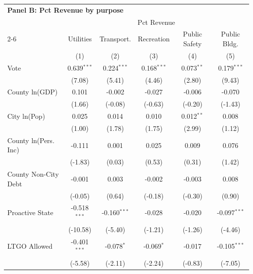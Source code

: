 \begingroup
\centering
\begin{tabular*}{\textwidth}{@{\extracolsep{\fill}}lccccc}
\multicolumn{5}{l}{\textbf{Panel B: Pct Revenue by purpose}}\\

\addlinespace
   \toprule
    & \multicolumn{5}{c}{Pct Revenue}\\
   \cmidrule(lr){2-6}
                        & Utilities      & Transport.     & Recreation    & Public Safety & Public Bldg. \\   
                        & (1)            & (2)            & (3)           & (4)           & (5)\\  
   \midrule 
   Vote                 & 0.639$^{***}$  & 0.224$^{***}$  & 0.168$^{***}$ & 0.073$^{**}$  & 0.179$^{***}$\\   
                        & (7.08)        & (5.41)        & (4.46)       & (2.80)       & (9.43)\\   
   County ln(GDP)       & 0.101          & -0.002         & -0.027        & -0.006        & -0.070\\   
                        & (1.66)        & (-0.08)       & (-0.63)      & (-0.20)      & (-1.43)\\   
   City ln(Pop)         & 0.025          & 0.014          & 0.010         & 0.012$^{**}$  & 0.008\\   
                        & (1.00)        & (1.78)        & (1.75)       & (2.99)       & (1.12)\\   
   County ln(Pers. Inc) & -0.111         & 0.001          & 0.025         & 0.009         & 0.076\\   
                        & (-1.83)       & (0.03)        & (0.53)       & (0.31)       & (1.42)\\   
   County Non-City Debt & -0.001         & 0.003          & -0.002        & -0.003        & 0.008\\   
                        & (-0.05)       & (0.64)        & (-0.18)      & (-0.30)      & (0.90)\\   
   Proactive State      & -0.518$^{***}$ & -0.160$^{***}$ & -0.028        & -0.020        & -0.097$^{***}$\\   
                        & (-10.58)      & (-5.40)       & (-1.21)      & (-1.26)      & (-4.46)\\   
   LTGO Allowed         & -0.401$^{***}$ & -0.078$^{*}$   & -0.069$^{*}$  & -0.017        & -0.105$^{***}$\\   
                        & (-5.58)       & (-2.11)       & (-2.24)      & (-0.83)      & (-7.05)\\   

\end{tabular*}
